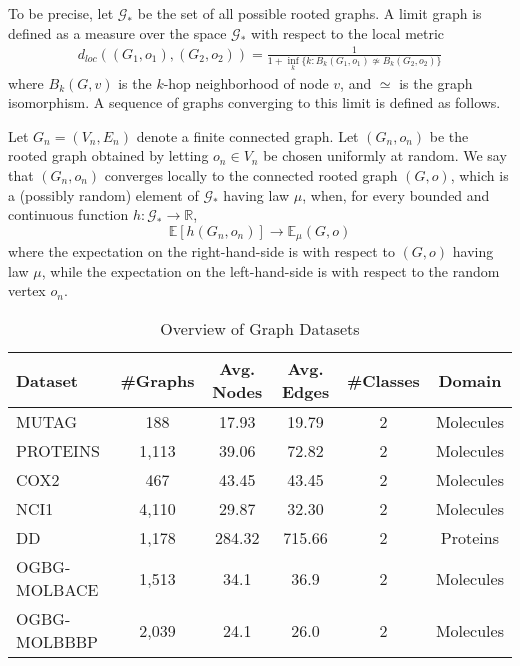 To be precise, let $\mathcal{G}_*$ be the set of all possible rooted graphs. A limit graph is defined as a measure over the space $\mathcal{G}_*$ with respect to the local metric
\begin{align*}
    d_{loc}((G_1,o_1),(G_2,o_2)) = \frac{1}{1+\inf_k\{k:B_k(G_1,o_1)\not\simeq B_k(G_2,o_2)\}}
\end{align*}
 where $B_k(G,v)$ is the $k$-hop neighborhood of node $v$, and $\simeq$ is the graph isomorphism. A sequence of graphs converging to this limit is defined as follows.

\begin{definition} Let $G_n = (V_n, E_n)$ denote a finite connected graph. Let $(G_n, o_n)$ be the rooted graph obtained by letting $o_n \in V_n$ be chosen uniformly at random. We say that $(G_n, o_n)$ converges locally to the connected rooted graph $(G, o)$, which is a (possibly random) element of $\mathcal{G}_*$ having law $\mu$, when, for every bounded and continuous function $h: \mathcal{G}_* \to \mathbb{R}$,
$$
\mathbb{E}[h(G_n,o_n)] \to \mathbb{E}_\mu(G,o)
$$
where the expectation on the right-hand-side is with respect to $(G, o)$ having law $\mu$, while the expectation on the left-hand-side is with respect to the random vertex $o_n$.
\end{definition}

\begin{table}[ht]
\centering
\caption{Overview of Graph Datasets}
\vskip 0.1in
\begin{tabular}{lccccc}
\toprule
\textbf{Dataset} & \textbf{\#Graphs} & \textbf{Avg. Nodes} & \textbf{Avg. Edges} & \textbf{\#Classes} & \textbf{Domain}\\
\midrule
MUTAG & 188 & 17.93 & 19.79 & 2 & Molecules\\
PROTEINS & 1,113 & 39.06 & 72.82 & 2 & Molecules \\
COX2 & 467 & 43.45 & 43.45 & 2 & Molecules \\
NCI1 & 4,110 & 29.87 & 32.30 & 2 & Molecules \\
DD & 1,178 & 284.32 & 715.66 & 2 & Proteins \\
OGBG-MOLBACE & 1,513 & 34.1 & 36.9 & 2 & Molecules \\
OGBG-MOLBBBP & 2,039 & 24.1 & 26.0 & 2 & Molecules \\
\bottomrule
\end{tabular}
\label{table:graph_datasets_summary}
\end{table}

